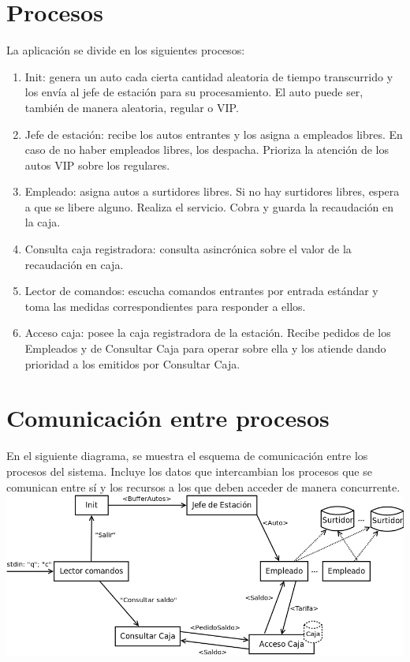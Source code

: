 \documentclass{article}
\begin{document}
\section{Procesos}
La aplicación se divide en los siguientes procesos:
\begin{enumerate}
	\item Init: genera un auto cada cierta cantidad aleatoria de tiempo transcurrido y los envía al jefe de estación para su procesamiento. El auto puede ser, también de manera aleatoria, regular o VIP.
	\item Jefe de estación: recibe los autos entrantes y los asigna a empleados libres. En caso de no haber empleados libres, los despacha. Prioriza la atención de los autos VIP sobre los regulares.
	\item Empleado: asigna autos a surtidores libres. Si no hay surtidores libres, espera a que se libere alguno. Realiza el servicio. Cobra y guarda la recaudación en la caja.
	\item Consulta caja registradora: consulta asincrónica sobre el valor de la recaudación en caja.
	\item Lector de comandos: escucha comandos entrantes por entrada estándar y toma las medidas correspondientes para responder a ellos.
	\item Acceso caja: posee la caja registradora de la estación. Recibe pedidos de los Empleados y de Consultar Caja para operar sobre ella y los atiende dando prioridad a los emitidos por Consultar Caja.
\end{enumerate}

\section{Comunicación entre procesos}
En el siguiente diagrama, se muestra el esquema de comunicación entre los procesos del sistema. Incluye los datos que intercambian los procesos que se comunican entre sí y los recursos a los que deben acceder de manera concurrente.
\\[1\baselineskip]
\includegraphics[width=\textwidth]{overview2}
\end{document}

